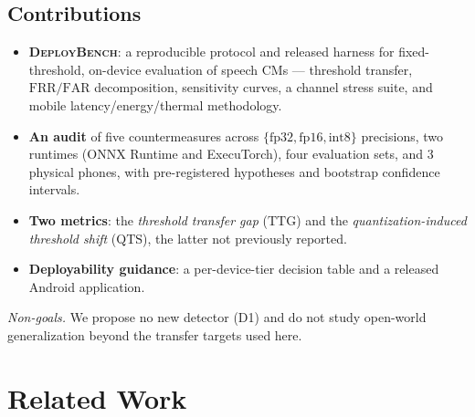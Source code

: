 \documentclass[journal]{IEEEtran}
\newcommand{\bench}{\textsc{DeployBench}}
\newcommand{\ttg}{\mathrm{TTG}}
\newcommand{\qts}{\mathrm{QTS}}
\newcommand{\frr}{\mathrm{FRR}}
\newcommand{\far}{\mathrm{FAR}}
\begin{document}
\subsection*{Contributions}
\begin{itemize}
  \item \textbf{\bench{}}: a reproducible protocol and released harness for
        fixed-threshold, on-device evaluation of speech CMs --- threshold
        transfer, \(\frr/\far\) decomposition, sensitivity curves, a channel
        stress suite, and mobile latency/energy/thermal methodology.
  \item \textbf{An audit} of five countermeasures across
        \(\{\text{fp32},\text{fp16},\text{int8}\}\) precisions,
        two runtimes (ONNX Runtime and ExecuTorch),
        four evaluation sets, and 3 physical phones, with pre-registered
        hypotheses and bootstrap confidence intervals.
  \item \textbf{Two metrics}: the \emph{threshold transfer gap} (\(\ttg\)) and the
        \emph{quantization-induced threshold shift} (\(\qts\)), the latter not
        previously reported.
  \item \textbf{Deployability guidance}: a per-device-tier decision table and a
        released Android application.
\end{itemize}
\noindent\emph{Non-goals.} We propose no new detector (D1) and do not study
open-world generalization beyond the transfer targets used here.

\section{Related Work}
\label{sec:related}
\end{document}
